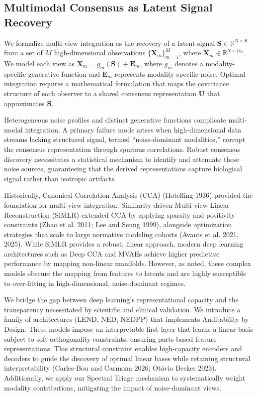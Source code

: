 \documentclass[
  letterpaper,
]{report}
\begin{document}
\subsection{Multimodal Consensus as Latent Signal
Recovery}\label{multimodal-consensus-as-latent-signal-recovery}

We formalize multi-view integration as the recovery of a latent signal
\(\mathbf{S} \in \mathbb{R}^{N \times K}\) from a set of \(M\)
high-dimensional observations \(\{\mathbf{X}_m\}_{m=1}^M\), where
\(\mathbf{X}_m \in \mathbb{R}^{N \times D_m}\). We model each view as
\(\mathbf{X}_m = g_m(\mathbf{S}) + \mathbf{E}_m\), where \(g_m\) denotes
a modality-specific generative function and \(\mathbf{E}_m\) represents
modality-specific noise. Optimal integration requires a mathematical
formulation that maps the covariance structure of each observer to a
shared consensus representation \(\mathbf{U}\) that approximates
\(\mathbf{S}\).

Heterogeneous noise profiles and distinct generative functions
complicate multi-modal integration. A primary failure mode arises when
high-dimensional data streams lacking structured signal, termed
``noise-dominant modalities,'' corrupt the consensus representation
through spurious correlations. Robust consensus discovery necessitates a
statistical mechanism to identify and attenuate these noise sources,
guaranteeing that the derived representations capture biological signal
rather than isotropic artifacts.

Historically, Canonical Correlation Analysis (CCA) (Hotelling 1936)
provided the foundation for multi-view integration. Similarity-driven
Multi-view Linear Reconstruction (SiMLR) extended CCA by applying
sparsity and positivity constraints (Zhao et al. 2011; Lee and Seung
1999), alongside optimization strategies that scale to large normative
modeling cohorts (Avants et al. 2021, 2025). While SiMLR provides a
robust, linear approach, modern deep learning architectures such as Deep
CCA and MVAEs achieve higher predictive performance by mapping
non-linear manifolds. However, as noted, these complex models obscure
the mapping from features to latents and are highly susceptible to
over-fitting in high-dimensional, noise-dominant regimes.

We bridge the gap between deep learning's representational capacity and
the transparency necessitated by scientific and clinical validation. We
introduce a family of architectures (LEND, NED, NEDPP) that implements
Auditability by Design. These models impose an interpretable first layer
that learns a linear basis subject to soft orthogonality constraints,
ensuring parts-based feature representations. This structural constraint
enables high-capacity encoders and decoders to guide the discovery of
optimal linear bases while retaining structural interpretability
(Carles-Bou and Carmona 2026; Otávio Becker 2023). Additionally, we
apply our Spectral Triage mechanism to systematically weight modality
contributions, mitigating the impact of noise-dominant views.
\end{document}
